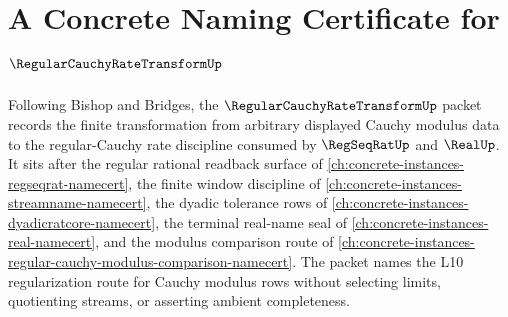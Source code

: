 \chapter{A Concrete Naming Certificate for $\RegularCauchyRateTransformUp$}
\label{ch:concrete-instances-regular-cauchy-rate-transform-namecert}

Following Bishop and Bridges, the $\RegularCauchyRateTransformUp$ packet records the finite transformation from arbitrary displayed Cauchy modulus data to the regular-Cauchy rate discipline consumed by $\RegSeqRatUp$ and $\RealUp$. It sits after the regular rational readback surface of \autoref{ch:concrete-instances-regseqrat-namecert}, the finite window discipline of \autoref{ch:concrete-instances-streamname-namecert}, the dyadic tolerance rows of \autoref{ch:concrete-instances-dyadicratcore-namecert}, the terminal real-name seal of \autoref{ch:concrete-instances-real-namecert}, and the modulus comparison route of \autoref{ch:concrete-instances-regular-cauchy-modulus-comparison-namecert}. The packet names the L10 regularization route for Cauchy modulus rows without selecting limits, quotienting streams, or asserting ambient completeness.

